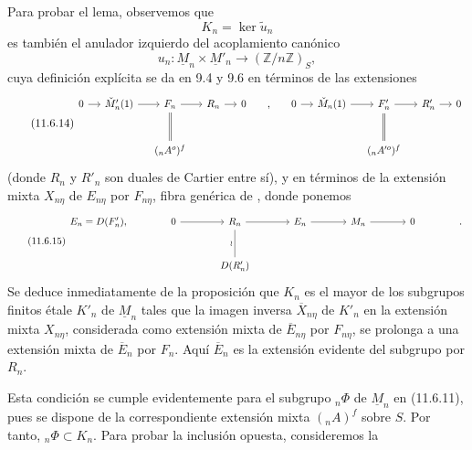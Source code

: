 
Para probar el lema, observemos que
\begin{equation*}
K_n=\ker\widetilde u_n
\end{equation*}
es también el anulador izquierdo del acoplamiento canónico
\begin{equation*}
u_n:\underline M_n\times\underline M'_n
 \longrightarrow(\mathbb Z/n\mathbb Z)_S,
\end{equation*}
cuya definición explícita se da en 9.4 y 9.6 en términos de las
extensiones
\begin{equation}\tag{11.6.14}
\resizebox{\textwidth}{!}{%
\begin{tikzcd}[ampersand replacement=\&, column sep=small, row sep=large]
0 \arrow[r]
 \& {\ensuremath{\check{\underline M}'_n(1)}} \arrow[r]
 \& F_n \arrow[r] \arrow[d, equal]
 \& R_n \arrow[r]
 \& 0
 \& {,}
 \& 0 \arrow[r]
 \& {\ensuremath{\check{\underline M}_n(1)}} \arrow[r]
 \& F'_n \arrow[r] \arrow[d, equal]
 \& R'_n \arrow[r]
 \& 0 \\
{}
 \& {}
 \& ({}_nA^o)^f
 \& {}
 \& {}
 \& {}
 \& {}
 \& {}
 \& ({}_nA'^o)^f
 \& {}
 \& {}
\end{tikzcd}}
\end{equation}
(donde $R_n$ y $R'_n$ son duales de Cartier entre sí), y en términos
de la extensión mixta $X_{n\eta}$ de $E_{n\eta}$ por $F_{n\eta}$,
fibra genérica de , donde ponemos
\begin{equation}\tag{11.6.15}
\begin{tikzcd}[column sep=large, row sep=large]
E_n=D(\sisi{F_n}{F'_n}),
 & 0 \arrow[r]
 & R_n \arrow[r] \arrow[d, no head, "\wr"']
 & E_n \arrow[r]
 & \underline M_n \arrow[r]
 & 0
 & {.} \\
{}
 & {}
 & D(R'_n)
 & {}
 & {}
 & {}
 & {}
\end{tikzcd}
\end{equation}
Se deduce inmediatamente de la proposición
 que $K_n$ es el mayor de los subgrupos finitos
étale $K'_n$ de $\underline M_n$ tales que la imagen inversa
$\overline X_{n\eta}$ de $K'_n$ en la extensión mixta $X_{n\eta}$,
considerada como extensión mixta de $\overline E_{n\eta}$ por
$F_{n\eta}$, se prolonga a una extensión mixta de $\overline E_n$ por
$F_n$. Aquí $\overline E_n$ es la extensión evidente del subgrupo
 por $R_n$.

Esta condición se cumple evidentemente para el subgrupo ${}_n\Phi$ de
$\underline M_n$ en (11.6.11), pues se dispone de la correspondiente
extensión mixta $({}_nA)^f$ sobre $S$. Por tanto,
${}_n\Phi\subset K_n$. Para probar la inclusión opuesta, consideremos
la

